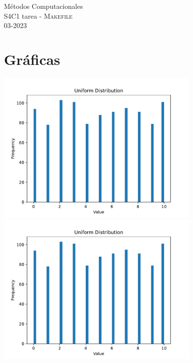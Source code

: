 \documentclass[11pt,letterpaper]{exam}
\begin{document}
\begin{center}
{\Large Métodos Computacionales} \\
S4C1 tarea - \textsc{Makefile}\\
03-2023\\
\end{center}


\noindent
\section{Gr\'aficas}
\begin{center}
\includegraphics[width=10cm,page=1]{histogramas.pdf}
\includegraphics[width=10cm,page=2]{histogramas.pdf}
\end{center}
\end{document}
